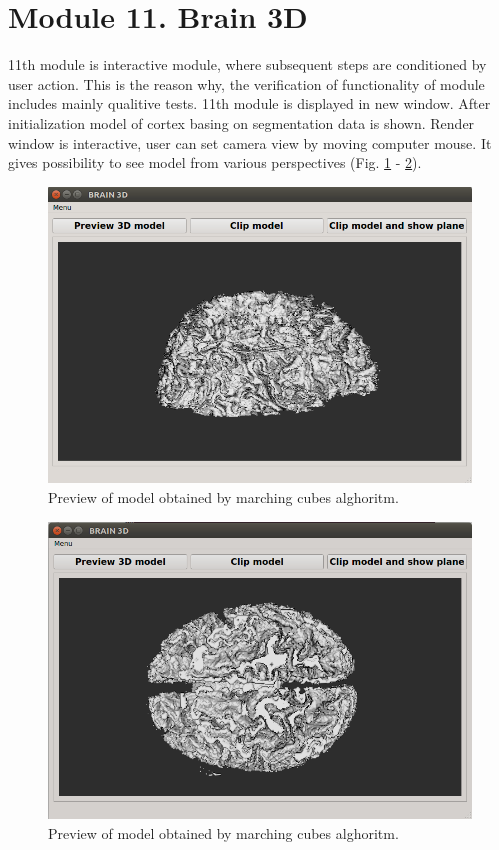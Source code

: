 \section{Module 11. Brain 3D}
\indent
11th module is interactive module, where subsequent steps are conditioned by user action. This is the reason why, the verification of functionality of module includes mainly qualitive tests.
11th module is displayed in new window. After initialization model of cortex basing on segmentation data is shown. Render window is interactive, user can set camera view by moving computer mouse. It gives possibility to see model from various perspectives (Fig. \ref{fig:figures/11_test_1} - \ref{fig:figures/11_test_2}).
\begin{figure}[H]
\centering{}\includegraphics[scale=0.7]{figures/Module_11/11_test_1.png}\caption{Preview of model obtained by marching cubes alghoritm. \label{fig:figures/11_test_1}}
\end{figure}
\begin{figure}[H]
\centering{}\includegraphics[scale=0.7]{figures/Module_11/11_test_2.png}\caption{Preview of model obtained by marching cubes alghoritm. \label{fig:figures/11_test_2}}
\end{figure}
